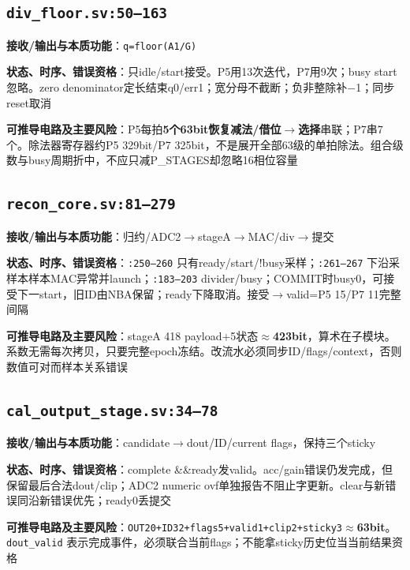 \documentclass[UTF8,fontset=fandol,10pt,a4paper,openany]{ctexrep}
\newcommand{\code}[1]{\nolinkurl{#1}}
\begin{document}
\subsection*{\code{div_floor.sv:50–163}}
\noindent\textbf{接收/输出与本质功能}：\code{q=floor(A1/G)}\par
\noindent\textbf{状态、时序、错误资格}：只idle/start接受。P5用13次迭代，P7用9次；busy start忽略。zero denominator定长结束q0/err1；宽分母不截断；负非整除补\ensuremath{-}1；同步reset取消\par
\noindent\textbf{可推导电路及主要风险}：P5每拍\textbf{5个63bit恢复减法/借位\ensuremath{\rightarrow}选择}串联；P7串7个。除法器寄存器约P5 329bit/P7 325bit，不是展开全部63级的单拍除法。组合级数与busy周期折中，不应只减P\_STAGES却忽略16相位容量\par
\subsection*{\code{recon_core.sv:81–279}}
\noindent\textbf{接收/输出与本质功能}：归约/ADC2\ensuremath{\rightarrow}stageA\ensuremath{\rightarrow}MAC/div\ensuremath{\rightarrow}提交\par
\noindent\textbf{状态、时序、错误资格}：\code{:250–260} 只有ready/start/!busy采样；\code{:261–267} 下沿采样本样本MAC异常并launch；\code{:183–203} divider/busy；COMMIT时busy0，可接受下一start，旧ID由NBA保留；ready下降取消。接受\ensuremath{\rightarrow}valid=P5 15/P7 11完整间隔\par
\noindent\textbf{可推导电路及主要风险}：stageA 418 payload+5状态\ensuremath{\approx}\textbf{423bit}，算术在子模块。系数无需每次拷贝，只要完整epoch冻结。改流水必须同步ID/flags/context，否则数值可对而样本关系错误\par
\subsection*{\code{cal_output_stage.sv:34–78}}
\noindent\textbf{接收/输出与本质功能}：candidate\ensuremath{\rightarrow}dout/ID/current flags，保持三个sticky\par
\noindent\textbf{状态、时序、错误资格}：complete \&\&ready发valid。acc/gain错误仍发完成，但保留最后合法dout/clip；ADC2 numeric ovf单独报告不阻止字更新。clear与新错误同沿新错误优先；ready0丢提交\par
\noindent\textbf{可推导电路及主要风险}：\code{OUT20+ID32+flags5+valid1+clip2+sticky3}\ensuremath{\approx}\textbf{63bit}。\code{dout_valid} 表示完成事件，必须联合当前flags；不能拿sticky历史位当当前结果资格\par
\end{document}
